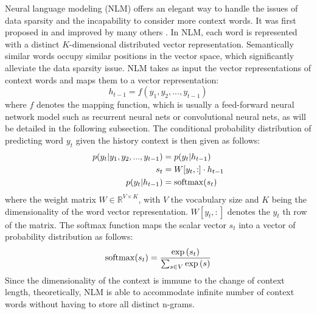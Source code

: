 Neural language modeling (NLM) offers an elegant way to handle the issues of  data sparsity and the incapability to consider more context words.
It was first proposed in  and improved by many others \cite{morin2005hierarchical,mnih2009scalable,mnih2012fast,le2014distributed,mikolov2010recurrent,graves2013generating,kim2016character}.
 In NLM, each word is represented with a distinct $K$-dimensional distributed vector representation. Semantically similar words occupy similar positions in the vector space, which significantly 
alleviate the data sparsity issue. 
NLM takes as input the vector representations of context words and maps them to a vector representation:
\begin{equation}
h_{t-1}=f (y_1, y_2, ..., y_{t-1})
\end{equation}
where $f$ denotes the mapping function, which is 
usually a feed-forward neural network model  
such as recurrent neural nets or convolutional neural nets, as will be detailed in the following subsection. 
The conditional probability distribution of predicting word $y_t$ given the history context is then given as follows: 
\begin{equation}
\begin{aligned}
p(y_t|y_1,y_2, ...,y_{t-1})&=p(y_t|h_{t-1})\\
s_t&=W [y_t, :]\cdot h_{t-1} \\
p(y_t|h_{t-1})&=\operatorname{softmax}(s_t)
\end{aligned}
\end{equation}
where the weight matrix $W \in \mathbb{R}^{V\times K}$, with $V$ the vocabulary size and $K$ being the dimensionality of the word vector representation. 
$W [y_t, :]$ denotes the $y_t$ th row of the matrix. 
The softmax function maps the scalar vector $s_t$ into a vector of probability distribution as follows:
\begin{equation}
\operatorname{softmax}(s_t)=\frac{\exp{(s_t)}}{\sum_{s\in V}\exp{(s)}}
\end{equation}
Since the dimensionality of the context is immune to the change of context length, theoretically, NLM is able to accommodate infinite number of context words without having to store all 
distinct n-grams. 



